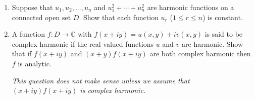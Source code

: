 \documentclass[12pt]{Qual}
\begin{document}
\begin{problem} $\,$
\begin{enumerate}[label=(\alph*)]
    \item Suppose that $u_1,u_2,...,u_n$ and $u_1^2+\cdots+u_n^2$ are harmonic functions on a connected open set $D$. Show that each function $u_r$ ($1\le r\le n$) is constant.
    \item A function $f:D\to\mathbb{C}$ with $f(x+iy)=u(x,y)+iv(x,y)$ is said to be complex harmonic if the real valued functions $u$ and $v$ are harmonic. Show that if $f(x+iy)$ and $(x+y)f(x+iy)$ are both complex harmonic then $f$ is analytic.

    \textit{ This question does not make sense unless we assume that $(x+iy)f(x+iy)$ is complex harmonic.}
\end{enumerate}
\end{problem}
\end{document}

